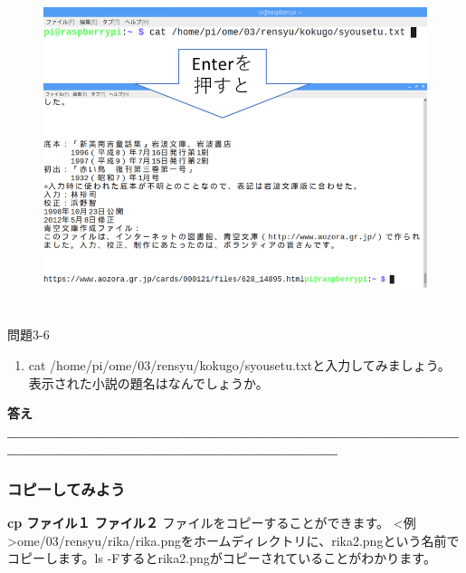 \documentclass[a4paper,dvipdfmx]{jarticle}
\begin{document}
\begin{figure}
\centering
\includegraphics[width=12.938cm,height=9.467cm]{text03-img/text03-img015.png}
\end{figure}
{\ttfamily
問題3-6}

\begin{enumerate}
\item cat
/home/pi/ome/03/rensyu/kokugo/syousetu.txtと入力してみましょう。\newline
表示された小説の題名はなんでしょうか。\newline

\end{enumerate}

\bigskip

{\ttfamily\bfseries
答え\_\_\_\_\_\_\_\_\_\_\_\_\_\_\_\_\_\_\_\_\_\_\_\_\_\_\_\_\_\_\_\_\_\_\_\_\_\_\_\_\_\_\_\_\_\_\_\_\_\_\_\_\_\_\_\_\_\_\_\_\_\_\_\_\_\_\_\_\_\_\_}

\subsubsection{}
\clearpage\subsubsection{コピーしてみよう}
\textbf{cp ファイル１ ファイル２}\newline
ファイルをコピーすることができます。\newline
{\textless}例{\textgreater}ome/03/rensyu/rika/rika.pngをホームディレクトリに、rika2.pngという名前でコピーします。ls
{}-Fするとrika2.pngがコピーされていることがわかります。
\end{document}
